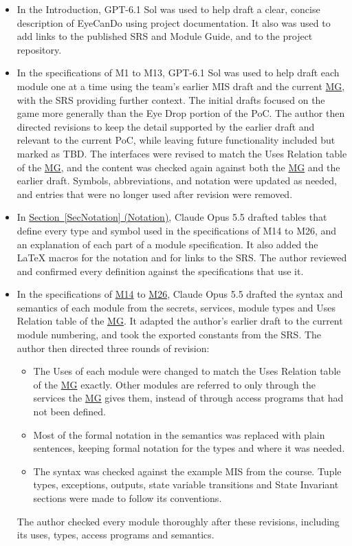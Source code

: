 \documentclass[10pt, titlepage]{article}
\newcommand{\mgurl}{https://github.com/team-hindsight/ophthamology-game/blob/main/pdfs/Design/SoftArchitecture/MG.pdf}
\newcommand{\mg}{\href{\mgurl}{MG}}
\newcommand{\misref}[2]{\hyperref[mis:#1]{M#2}}
\begin{document}
\begin{itemize}
    \item In the Introduction, GPT-6.1 Sol was used to help draft a clear, concise description
    of EyeCanDo using project documentation. It also was used to
    add links to the published SRS and Module Guide, and to the project
    repository.

    \item In the specifications of M1 to M13, GPT-6.1 Sol was used to help draft each module
    one at a time using the team's earlier MIS draft and the current \mg{},
    with the SRS providing further context. The initial drafts
    focused on the game more generally than the Eye Drop portion of the PoC.
    The author then directed revisions to keep the detail supported by the
    earlier draft and relevant to the current PoC, while leaving future
    functionality included but marked as TBD. The interfaces were revised to
    match the Uses Relation table of the \mg{}, and the content was checked again
    against both the \mg{} and the earlier draft. Symbols, abbreviations, and
    notation were updated as needed, and entries that were no longer used
    after revision were removed.

    \item In \hyperref[SecNotation]{Section~\ref*{SecNotation} (Notation)},
    Claude Opus 5.5 drafted tables that define every type and symbol used in
    the specifications of M14 to M26, and an explanation of each part of a
    module specification. It also added the \LaTeX{} macros for the notation
    and for links to the SRS. The author reviewed and confirmed every
    definition against the specifications that use it.

    \item In the specifications of
    \hyperref[mis:Reward]{\misref{Reward}{14}} to
    \hyperref[mis:Widgets]{\misref{Widgets}{26}}, Claude Opus 5.5 drafted the
    syntax and semantics of each module from the secrets, services, module
    types and Uses Relation table of the \mg{}. It adapted the author's earlier
    draft to the current module numbering, and took the exported constants
    from the SRS. The author then directed three rounds of revision:
    \begin{itemize}
        \item The Uses of each module were changed to match the Uses Relation
        table of the \mg{} exactly. Other modules are referred to only through
        the services the \mg{} gives them, instead of through access programs
        that had not been defined.
        \item Most of the formal notation in the semantics was replaced with
        plain sentences, keeping formal notation for the types and where it
        was needed.
        \item The syntax was checked against the example MIS from the course.
        Tuple types, exceptions, outputs, state variable transitions and
        State Invariant sections were made to follow its conventions.
    \end{itemize}
    The author checked every module thoroughly after these revisions,
    including its uses, types, access programs and semantics.


\end{itemize}
\end{document}
